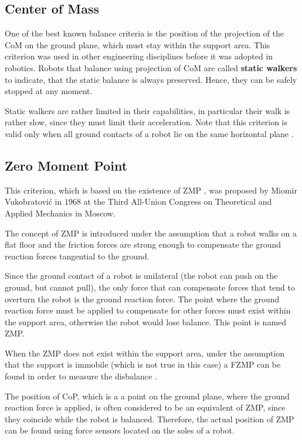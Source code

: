 \subsection{Center of Mass}
One of the best known balance criteria is the position of the projection of the \ac{CoM} 
on the ground plane, which must stay within the support area. This criterion was used in 
other engineering disciplines before it was adopted in robotics. Robots that balance 
using projection of \ac{CoM} are called {\bf static walkers} to indicate, that the 
static balance is always preserved. Hence, they can be safely stopped at any moment.

Static walkers are rather limited in their capabilities, in particular their walk is 
rather slow, since they must limit their acceleration. Note that this criterion is 
valid only when all ground contacts of a robot lie on the same horizontal plane 
\cite{WieberStability}.


\subsection{Zero Moment Point}
This criterion, which is based on the existence of \ac{ZMP} \cite{VukZMP35}, was 
proposed by Miomir Vukobratovi\'c in $1968$ at the Third All-Union Congress on 
Theoretical and Applied Mechanics in Moscow. 

The concept of \ac{ZMP} is introduced under the assumption that a robot walks on a flat
floor and the friction forces are strong enough to compensate the ground reaction
forces tangential to the ground.

Since the ground contact of a robot is unilateral (the robot can push on the ground, 
but cannot pull), the only force that can compensate forces that tend to overturn the 
robot is the ground reaction force. The point where the ground reaction force must be 
applied to compensate for other forces must exist within the support area, otherwise 
the robot would lose balance. This point is named \ac{ZMP}.

When the \ac{ZMP} does not exist within the support area, under the assumption that the
support is immobile (which is not true in this case) a \ac{FZMP} can be found in order 
to measure the disbalance \cite{VukHumanoidTerms}.

The position of \ac{CoP}, which is a a point on the ground plane, where the ground 
reaction force is applied, is often considered to be an equivalent of \ac{ZMP}, since they 
coincide while the robot is balanced. Therefore, the actual position of \ac{ZMP} can be 
found using force sensors located on the soles of a robot.

